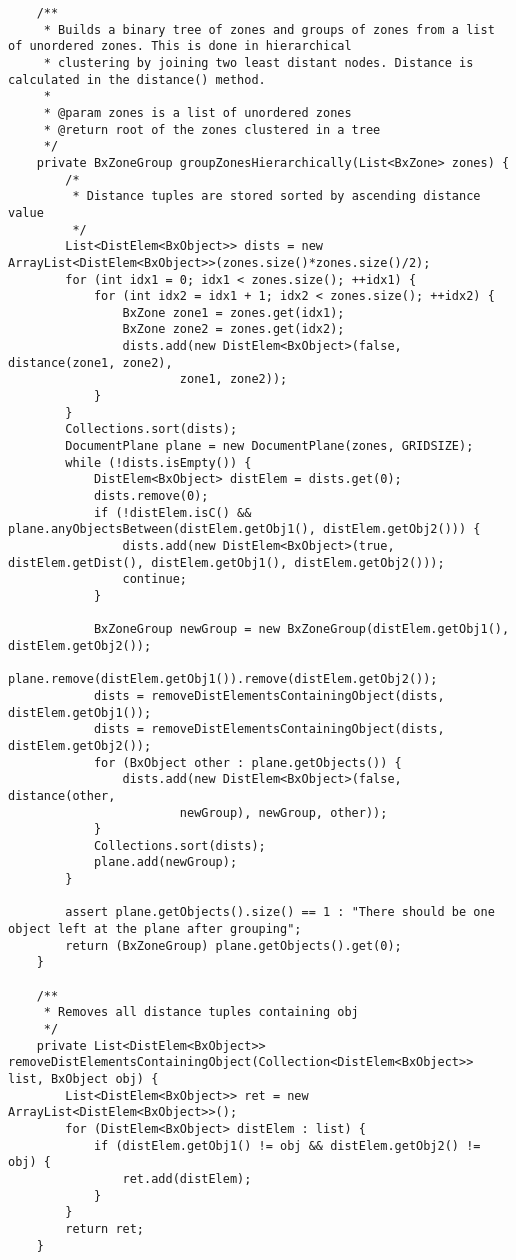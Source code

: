 \begin{appendix}
\begin{lstlisting}
    /**
     * Builds a binary tree of zones and groups of zones from a list of unordered zones. This is done in hierarchical
     * clustering by joining two least distant nodes. Distance is calculated in the distance() method.
     *
     * @param zones is a list of unordered zones
     * @return root of the zones clustered in a tree
     */
    private BxZoneGroup groupZonesHierarchically(List<BxZone> zones) {
        /*
         * Distance tuples are stored sorted by ascending distance value
         */
        List<DistElem<BxObject>> dists = new ArrayList<DistElem<BxObject>>(zones.size()*zones.size()/2);
        for (int idx1 = 0; idx1 < zones.size(); ++idx1) {
            for (int idx2 = idx1 + 1; idx2 < zones.size(); ++idx2) {
                BxZone zone1 = zones.get(idx1);
                BxZone zone2 = zones.get(idx2);
                dists.add(new DistElem<BxObject>(false, distance(zone1, zone2),
                        zone1, zone2));
            }
        }
        Collections.sort(dists);
        DocumentPlane plane = new DocumentPlane(zones, GRIDSIZE);
        while (!dists.isEmpty()) {
            DistElem<BxObject> distElem = dists.get(0);
            dists.remove(0);
            if (!distElem.isC() && plane.anyObjectsBetween(distElem.getObj1(), distElem.getObj2())) {
                dists.add(new DistElem<BxObject>(true, distElem.getDist(), distElem.getObj1(), distElem.getObj2()));
                continue;
            }

            BxZoneGroup newGroup = new BxZoneGroup(distElem.getObj1(), distElem.getObj2());
            plane.remove(distElem.getObj1()).remove(distElem.getObj2());
            dists = removeDistElementsContainingObject(dists, distElem.getObj1());
            dists = removeDistElementsContainingObject(dists, distElem.getObj2());
            for (BxObject other : plane.getObjects()) {
                dists.add(new DistElem<BxObject>(false, distance(other,
                        newGroup), newGroup, other));
            }
            Collections.sort(dists);
            plane.add(newGroup);
        }
        
        assert plane.getObjects().size() == 1 : "There should be one object left at the plane after grouping";
        return (BxZoneGroup) plane.getObjects().get(0);
    }

    /**
     * Removes all distance tuples containing obj
     */
    private List<DistElem<BxObject>> removeDistElementsContainingObject(Collection<DistElem<BxObject>> list, BxObject obj) {
        List<DistElem<BxObject>> ret = new ArrayList<DistElem<BxObject>>();
        for (DistElem<BxObject> distElem : list) {
            if (distElem.getObj1() != obj && distElem.getObj2() != obj) {
                ret.add(distElem);
            }
        }
        return ret;
    }


\end{lstlisting}
\end{appendix}
